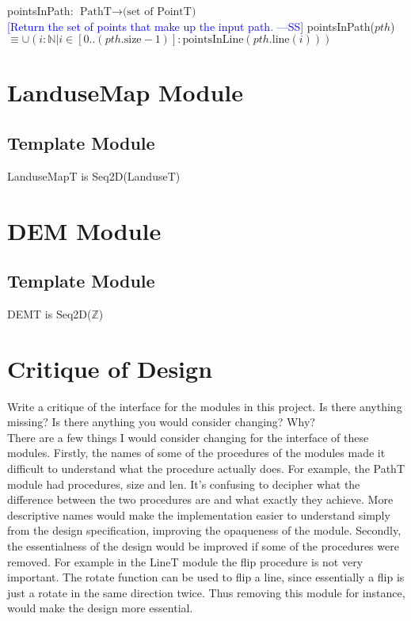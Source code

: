 \documentclass[12pt]{article}
\newcommand{\authornote}[3]{\textcolor{#1}{[#3 ---#2]}}
\newcommand{\authornote}[3]{}
\newcommand{\wss}[1]{\authornote{blue}{SS}{#1}}
\begin{document}
\noindent pointsInPath: $\mbox{PathT} \rightarrow \mbox{(set of PointT)}$\\
\wss{Return the set of points that make up the input path.}
\noindent pointsInPath($pth$)  $\equiv  \cup(i : \mathbb{N} | i \in [0.. (pth.\mbox{size} - 1)] : \mbox{pointsInLine}(pth.\mbox{line}(i)))$

\newpage

\section* {LanduseMap Module}

\subsection* {Template Module}

LanduseMapT is Seq2D(LanduseT)

\section* {DEM Module}

\subsection* {Template Module}

DEMT is Seq2D($\mathbb{Z}$)

\newpage

\section*{Critique of Design}

Write a critique of the interface for the modules in this project.  Is there
anything missing?  Is there anything you would consider changing?  Why? \\
There are a few things I would consider changing for the interface of these modules. Firstly, the names of some of the procedures of the modules made it difficult to understand what the procedure actually does. For example, the PathT module had procedures, size and len. It's confusing to decipher what the difference between the two procedures are and what exactly they achieve. More descriptive names would make the implementation easier to understand simply from the design specification, improving the opaqueness of the module. Secondly, the essentialness of the design would be improved if some of the procedures were removed. For example in the LineT module the flip procedure is not very important. The rotate function can be used to flip a line, since essentially a flip is just a rotate in the same direction twice. Thus removing this module for instance, would make the design more essential.
\end{document}
